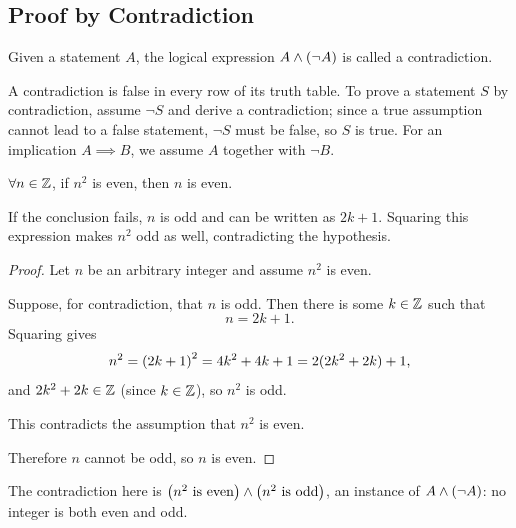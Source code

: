 \subsection{Proof by Contradiction}
\begin{definition}[Contradiction]
    Given a statement $A$, the logical expression $A \wedge \left(\neg A \right)$ is called a contradiction.
\end{definition}
A contradiction is false in every row of its truth table. To prove a statement $S$ by contradiction,
assume $\neg S$ and derive a contradiction; since a true assumption cannot lead to a false
statement, $\neg S$ must be false, so $S$ is true. For an implication $A \implies B$, we assume
$A$ together with $\neg B$.

\begin{proposition}
    $\forall n \in \mathbb{Z}$, if $n^2$ is even, then $n$ is even.
\end{proposition}
\begin{remark}
    If the conclusion fails, $n$ is odd and can be written as $2k+1$.
    Squaring this expression makes $n^2$ odd as well, contradicting the hypothesis.
\end{remark}
\begin{proof}
    Let $n$ be an arbitrary integer and assume $n^2$ is even.

    Suppose, for contradiction, that $n$ is odd. Then there is some $k\in\mathbb{Z}$ such that
    \begin{equation*}
        n = 2k + 1.
    \end{equation*}
    Squaring gives
    \begin{equation*}
        n^2 = \left(2k + 1 \right)^2 = 4k^2 + 4k + 1 = 2(2k^2 + 2k ) + 1,
    \end{equation*}
    and $2k^2 + 2k \in \mathbb{Z}$ (since $k \in \mathbb{Z}$), so $n^2$ is odd.

    This contradicts the assumption that $n^2$ is even.

    Therefore $n$ cannot be odd, so $n$ is even.
\end{proof}
\begin{remark}
    The contradiction here is $\left(n^2\text{ is even}\right)\wedge\left(n^2\text{ is odd}\right)$, an instance of $A\wedge\left(\neg A\right)$: no integer is both even and odd.
\end{remark}

